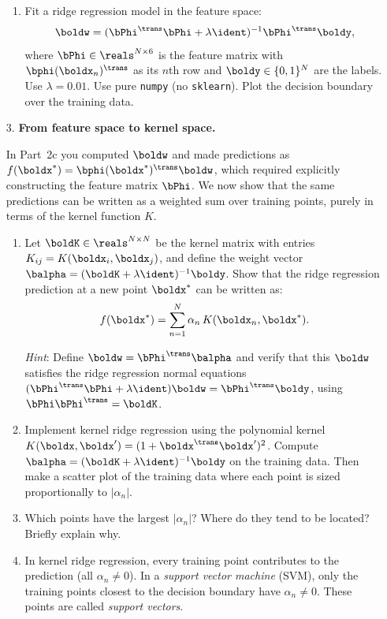 \documentclass[submit]{harvardml}
\begin{document}
\begin{problem}
\begin{enumerate}
\begin{enumerate}
    \item Fit a ridge regression model in the feature space:
    \[
      \boldw = (\bPhi^\trans \bPhi + \lambda \ident)^{-1} \bPhi^\trans \boldy,
    \]
    where $\bPhi \in \reals^{N \times 6}$ is the feature matrix with
    $\bphi(\boldx_n)^\trans$ as its $n$th row and $\boldy \in \{0, 1\}^N$
    are the labels. Use $\lambda = 0.01$. Use pure \texttt{numpy} (no \texttt{sklearn}).
    Plot the decision boundary over the training data.
  \end{enumerate}

  \item[3.] \textbf{From feature space to kernel space.}

  In Part~2c you computed $\boldw$ and made predictions as
  $f(\boldx^*) = \bphi(\boldx^*)^\trans \boldw$, which required
  explicitly constructing the feature matrix $\bPhi$. We now show that
  the same predictions can be written as a weighted sum over training
  points, purely in terms of the kernel function $K$.

  \begin{enumerate}
    \item Let $\boldK \in \reals^{N \times N}$ be the kernel matrix
    with entries $K_{ij} = K(\boldx_i, \boldx_j)$, and define
    the weight vector
    $\balpha = (\boldK + \lambda \ident)^{-1} \boldy$.
    Show that the ridge regression prediction at a new point $\boldx^*$
    can be written as:
    \[
      f(\boldx^*) = \sum_{n=1}^{N} \alpha_n \, K(\boldx_n, \boldx^*).
    \]

    \textit{Hint}: Define $\boldw = \bPhi^\trans \balpha$ and verify
    that this $\boldw$ satisfies the ridge regression normal equations
    $(\bPhi^\trans \bPhi + \lambda \ident)\boldw = \bPhi^\trans \boldy$,
    using $\bPhi \bPhi^\trans = \boldK$.

    \item Implement kernel ridge regression using the polynomial kernel
    $K(\boldx, \boldx') = (1 + \boldx^\trans \boldx')^2$. Compute
    $\balpha = (\boldK + \lambda \ident)^{-1} \boldy$ on the
    training data. Then make a scatter plot of the training data where
    each point is sized proportionally to $|\alpha_n|$.

    \item Which points have the largest $|\alpha_n|$? Where do they tend
    to be located? Briefly explain why.

    \item In kernel ridge regression, every training point contributes to
    the prediction (all $\alpha_n \neq 0$). In a \emph{support vector
    machine} (SVM), only the training points closest to the decision
    boundary have $\alpha_n \neq 0$. These points are called
    \emph{support vectors}.


\end{enumerate}
\end{enumerate}
\end{problem}
\end{document}
